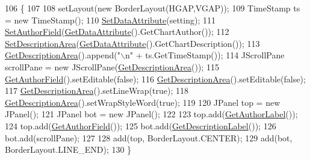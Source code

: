 \begin{DoxyCode}
106                                                     \{
107         
108         setLayout(\textcolor{keyword}{new} BorderLayout(HGAP,VGAP));
109         TimeStamp ts = \textcolor{keyword}{new} TimeStamp();
110         \hyperlink{class_information_j_panel_ac051ccc3facbbb65afcb8e3246157000}{SetDataAttribute}(setting);
111         \hyperlink{class_information_j_panel_a19b28c461ef20fceb876afa04ef56f3e}{SetAuthorField}(\hyperlink{class_information_j_panel_aecd081b72d4c75f3a6a92c3edeaf3693}{GetDataAttribute}().GetChartAuthor());
112         \hyperlink{class_information_j_panel_acdc378d528647247674ccf45b071e329}{SetDescriptionArea}(\hyperlink{class_information_j_panel_aecd081b72d4c75f3a6a92c3edeaf3693}{GetDataAttribute}().GetChartDescription());
113         \hyperlink{class_information_j_panel_a836fd4b83ed476210ba7cbbc10fcf454}{GetDescriptionArea}().append(\textcolor{stringliteral}{"\(\backslash\)n"} + ts.GetTimeStamp());
114         JScrollPane scrollPane = \textcolor{keyword}{new} JScrollPane(\hyperlink{class_information_j_panel_a836fd4b83ed476210ba7cbbc10fcf454}{GetDescriptionArea}());
115         \hyperlink{class_information_j_panel_a5a315426cb0994bdcf41713930ffc16c}{GetAuthorField}().setEditable(\textcolor{keyword}{false});
116         \hyperlink{class_information_j_panel_a836fd4b83ed476210ba7cbbc10fcf454}{GetDescriptionArea}().setEditable(\textcolor{keyword}{false});
117         \hyperlink{class_information_j_panel_a836fd4b83ed476210ba7cbbc10fcf454}{GetDescriptionArea}().setLineWrap(\textcolor{keyword}{true});
118         \hyperlink{class_information_j_panel_a836fd4b83ed476210ba7cbbc10fcf454}{GetDescriptionArea}().setWrapStyleWord(\textcolor{keyword}{true});
119         
120         JPanel top = \textcolor{keyword}{new} JPanel();
121         JPanel bot = \textcolor{keyword}{new} JPanel();
122         
123         top.add(\hyperlink{class_information_j_panel_a56627ef87297c80e92b05db708a478e2}{GetAuthorLabel}());
124         top.add(\hyperlink{class_information_j_panel_a5a315426cb0994bdcf41713930ffc16c}{GetAuthorField}());
125         bot.add(\hyperlink{class_information_j_panel_a6e2933b638efb56af0c3b7a350222e11}{GetDescriptionLabel}());
126         bot.add(scrollPane);
127         
128         add(top, BorderLayout.CENTER);
129         add(bot, BorderLayout.LINE\_END);
130     \}
\end{DoxyCode}



